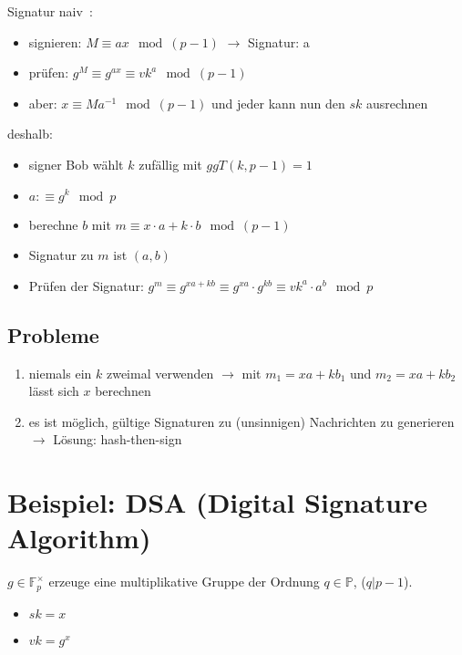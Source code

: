 \documentclass[a4paper,twoside,DIV15,BCOR12mm]{scrbook}
\begin{document}
Signatur \glqq naiv\grqq\ :

\begin{itemize}
	\item signieren: $M \equiv ax \mod{(p-1)}$ $\rightarrow$ Signatur: a
	\item prüfen: $g^M \equiv g^{ax} \equiv {vk}^a \mod{(p-1)}$
	\item aber: $x \equiv Ma^{-1} \mod{(p-1)}$ und jeder kann nun den $sk$ ausrechnen
\end{itemize}

deshalb:

\begin{itemize}
	\item signer Bob wählt $k$ zufällig mit $ggT(k, p-1) = 1$
	\item $ a :\equiv g^k \mod{p}$
	\item berechne $b$ mit $m \equiv x \cdot a + k \cdot b \mod{(p-1)}$
	\item Signatur zu $m$ ist $(a,b)$
	\item Prüfen der Signatur: $g^m \equiv g^{xa+kb} \equiv g^{xa} \cdot g^{kb} \equiv {vk}^a \cdot a^b \mod{p}$
\end{itemize}

\subsection{Probleme}

\begin{enumerate}
	\item niemals ein $k$ zweimal verwenden $\rightarrow$ mit $m_1 = xa +kb_1$ und $m_2 = xa + kb_2$ lässt sich $x$ berechnen
	\item es ist möglich, gültige Signaturen zu (unsinnigen) Nachrichten zu generieren $\rightarrow$ Lösung: hash-then-sign
\end{enumerate}

\section{Beispiel: DSA (Digital Signature Algorithm)}

$g \in \mathbb{F}_p^\times$ erzeuge eine multiplikative Gruppe der Ordnung $q \in \mathbb{P}$, ($q | p-1$).

\begin{itemize}
	\item $sk = x$
	\item $vk = g^x$
\end{itemize}
\end{document}

